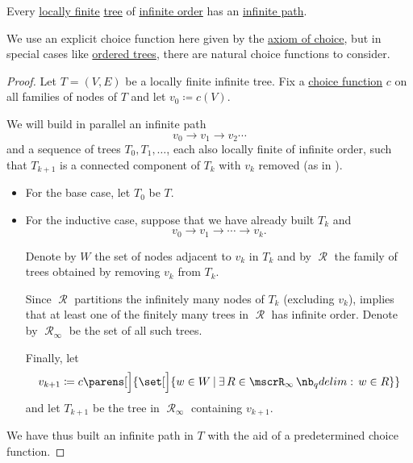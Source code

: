 \begin{lemma}\label{thm:konigs_infinity_lemma}
  Every \hyperref[def:graph_cardinality/local]{locally finite} \hyperref[def:tree]{tree} of \hyperref[def:graph_cardinality/order]{infinite order} has an \hyperref[def:graph_walk/path]{infinite path}.
\end{lemma}
\begin{comments}
  \item We use an explicit choice function here given by the \hyperref[def:zfc/choice]{axiom of choice}, but in special cases like \hyperref[def:ordered_tree]{ordered trees}, there are natural choice functions to consider.
\end{comments}
\begin{proof}
  Let \( T = (V, E) \) be a locally finite infinite tree. Fix a \hyperref[def:choice_function]{choice function} \( c \) on all families of nodes of \( T \) and let \( v_0 \coloneqq c(V) \).

  We will build in parallel an infinite path
  \begin{equation*}
    v_0 \to v_1 \to v_2 \cdots
  \end{equation*}
  and a sequence of trees \( T_0, T_1, \ldots \), each also locally finite of infinite order, such that \( T_{k+1} \) is a connected component of \( T_k \) with \( v_k \) removed (as in ).

  \begin{itemize}
    \item For the base case, let \( T_0 \) be \( T \).

    \item For the inductive case, suppose that we have already built \( T_k \) and
    \begin{equation*}
      v_0 \to v_1 \to \cdots \to v_k.
    \end{equation*}

    Denote by \( W \) the set of nodes adjacent to \( v_k \) in \( T_k \) and by \( \mscrR \) the family of trees obtained by removing \( v_k \) from \( T_k \).

    Since \( \mscrR \) partitions the infinitely many nodes of \( T_k \) (excluding \( v_k \)),  implies that at least one of the finitely many trees in \( \mscrR \) has infinite order. Denote by \( \mscrR_\infty \) be the set of all such trees.

    Finally, let
    \begin{equation*}
      v_{k+1} \coloneqq c\parens[\Big]{ \set[\Big]{ w \in W \given \qexists* {R \in \mscrR_\infty} w \in R } }
    \end{equation*}
    and let \( T_{k+1} \) be the tree in \( \mscrR_\infty \) containing \( v_{k+1} \).
  \end{itemize}

  We have thus built an infinite path in \( T \) with the aid of a predetermined choice function.
\end{proof}

